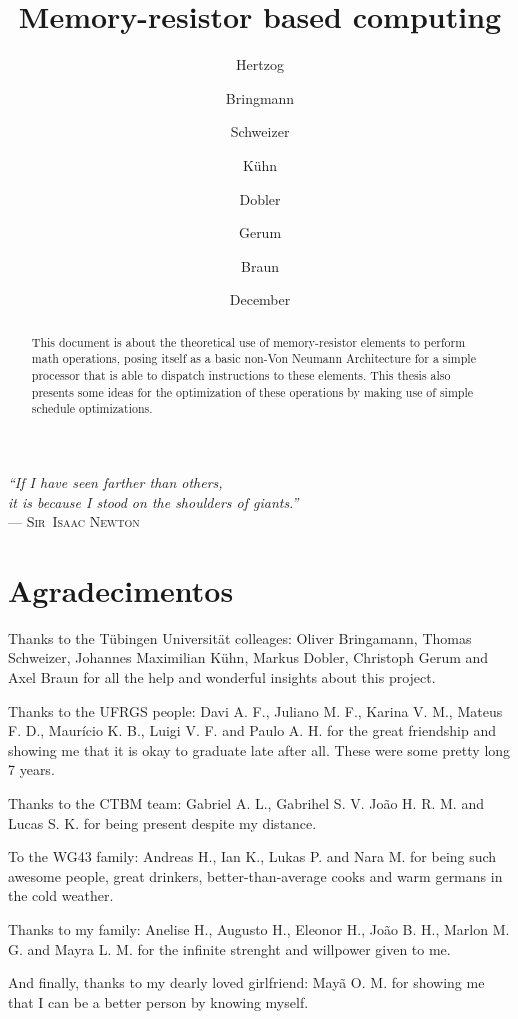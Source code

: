 \documentclass[ecp,tc,english]{iiufrgs}
\title{Memory-resistor based computing}
\author{Hertzog}{Alexandre}
\author{Bringmann}{Oliver}
\author{Schweizer}{Thomas}
\author{Kühn}{Johannes Maximilian}
\author{Dobler}{Markus}
\author{Gerum}{Christoph}
\author{Braun}{Axel}
\date{December}{2015}
\begin{document}
\maketitle

\clearpage
\begin{flushright}
\mbox{}\vfill
{\sffamily\itshape
``If I have seen farther than others,\\
it is because I stood on the shoulders of giants.''\\}
--- \textsc{Sir~Isaac Newton}
\end{flushright}

\chapter{Agradecimentos}
Thanks to the Tübingen Universität colleages: Oliver Bringamann, Thomas Schweizer, Johannes Maximilian Kühn, Markus Dobler, Christoph Gerum and Axel Braun for all the help and wonderful insights about this project.

Thanks to the UFRGS people: Davi A. F., Juliano M. F., Karina V. M., Mateus F. D., Maurício K. B., Luigi V. F. and Paulo A. H. for the great friendship and showing me that it is okay to graduate late after all. These were some pretty long 7 years.

Thanks to the CTBM team: Gabriel A. L., Gabrihel S. V. João H. R. M. and Lucas S. K. for being present despite my distance.

To the WG43 family: Andreas H., Ian K., Lukas P. and Nara M. for being such awesome people, great drinkers, better-than-average cooks and warm germans in the cold weather.

Thanks to my family: Anelise H., Augusto H., Eleonor H., João B. H., Marlon M. G. and Mayra L. M. for the infinite strenght and willpower given to me.

And finally, thanks to my dearly loved girlfriend: Mayã O. M. for showing me that I can be a better person by knowing myself.

\begin{abstract}

This document is about the theoretical use of memory-resistor elements to perform math operations, posing itself as a basic non-Von Neumann Architecture for a simple processor that is able to dispatch instructions to these elements. This thesis also presents some ideas for the optimization of these operations by making use of simple schedule optimizations.

\end{abstract}
\end{document}
